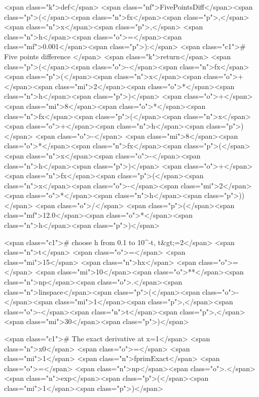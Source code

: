 <span class="k">def</span> <span class="nf">FivePointsDiff</span><span class="p">(</span><span class="n">fx</span><span class="p">,</span> <span class="n">x</span><span class="p">,</span> <span class="n">h</span><span class="o">=</span><span class="mf">0.001</span><span class="p">):</span>
    <span class="c1"># Five points difference </span>
    <span class="k">return</span> <span class="p">(</span><span class="o">-</span><span class="n">fx</span><span class="p">(</span><span class="n">x</span><span class="o">+</span><span class="mi">2</span><span class="o">*</span><span class="n">h</span><span class="p">)</span> <span class="o">+</span> <span class="mi">8</span><span class="o">*</span><span class="n">fx</span><span class="p">(</span><span class="n">x</span><span class="o">+</span><span class="n">h</span><span class="p">)</span> <span class="o">-</span> <span class="mi">8</span><span class="o">*</span><span class="n">fx</span><span class="p">(</span><span class="n">x</span><span class="o">-</span><span class="n">h</span><span class="p">)</span> <span class="o">+</span> <span class="n">fx</span><span class="p">(</span><span class="n">x</span><span class="o">-</span><span class="mi">2</span><span class="o">*</span><span class="n">h</span><span class="p">))</span> <span class="o">/</span> <span class="p">(</span><span class="mf">12.0</span><span class="o">*</span><span class="n">h</span><span class="p">)</span>

<span class="c1"># choose h from 0.1 to 10^-t, t&gt;=2</span>
<span class="n">t</span> <span class="o">=</span> <span class="mi">15</span>
<span class="n">hx</span> <span class="o">=</span> <span class="mi">10</span><span class="o">**</span><span class="n">np</span><span class="o">.</span><span class="n">linspace</span><span class="p">(</span><span class="o">-</span><span class="mi">1</span><span class="p">,</span><span class="o">-</span><span class="n">t</span><span class="p">,</span> <span class="mi">30</span><span class="p">)</span>

<span class="c1"># The exact derivative at x=1</span>
<span class="n">x0</span> <span class="o">=</span> <span class="mi">1</span>
<span class="n">fprimExact</span> <span class="o">=</span> <span class="n">np</span><span class="o">.</span><span class="n">exp</span><span class="p">(</span><span class="mi">1</span><span class="p">)</span>

